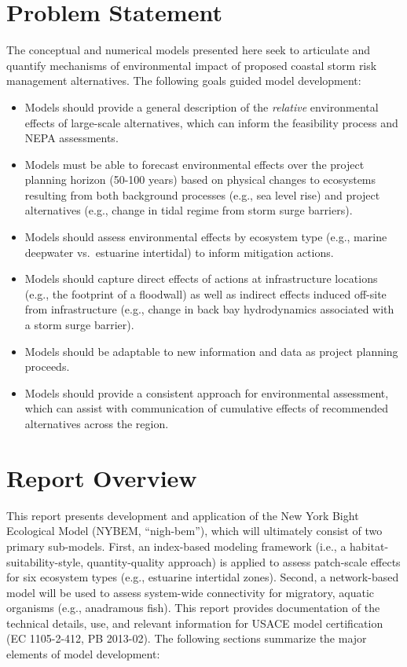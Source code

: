 \documentclass[
]{book}
\begin{document}
\hypertarget{problem-statement}{%
\section{Problem Statement}\label{problem-statement}}

The conceptual and numerical models presented here seek to articulate and quantify mechanisms of environmental impact of proposed coastal storm risk management alternatives. The following goals guided model development:

\begin{itemize}
\item
  Models should provide a general description of the \emph{relative} environmental effects of large-scale alternatives, which can inform the feasibility process and NEPA assessments.
\item
  Models must be able to forecast environmental effects over the project planning horizon (50-100 years) based on physical changes to ecosystems resulting from both background processes (e.g., sea level rise) and project alternatives (e.g., change in tidal regime from storm surge barriers).
\item
  Models should assess environmental effects by ecosystem type (e.g., marine deepwater vs.~estuarine intertidal) to inform mitigation actions.
\item
  Models should capture direct effects of actions at infrastructure locations (e.g., the footprint of a floodwall) as well as indirect effects induced off-site from infrastructure (e.g., change in back bay hydrodynamics associated with a storm surge barrier).
\item
  Models should be adaptable to new information and data as project planning proceeds.
\item
  Models should provide a consistent approach for environmental assessment, which can assist with communication of cumulative effects of recommended alternatives across the region.
\end{itemize}

\hypertarget{report-overview}{%
\section{Report Overview}\label{report-overview}}

This report presents development and application of the New York Bight Ecological Model (NYBEM, ``nigh-bem''), which will ultimately consist of two primary sub-models. First, an index-based modeling framework (i.e., a habitat-suitability-style, quantity-quality approach) is applied to assess patch-scale effects for six ecosystem types (e.g., estuarine intertidal zones). Second, a network-based model will be used to assess system-wide connectivity for migratory, aquatic organisms (e.g., anadramous fish). This report provides documentation of the technical details, use, and relevant information for USACE model certification (EC 1105-2-412, PB 2013-02). The following sections summarize the major elements of model development:
\end{document}
